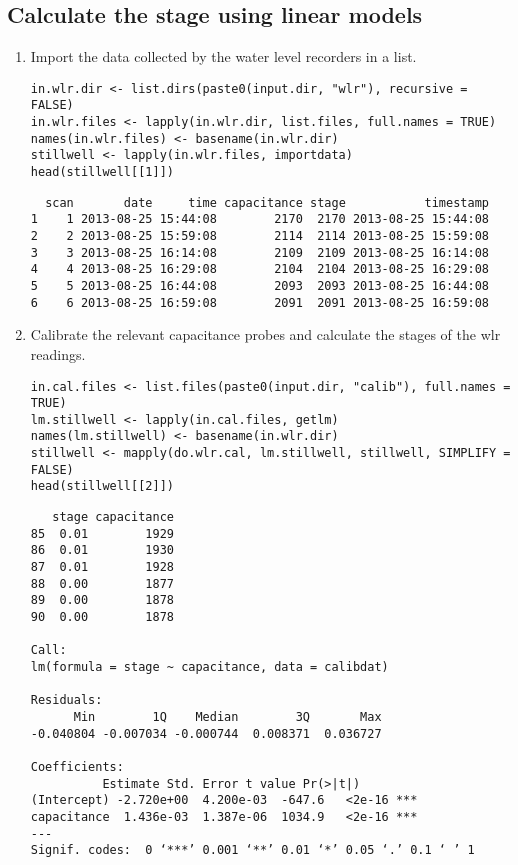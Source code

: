 \documentclass[a4paper]{article}
\begin{document}
\subsection*{Calculate the stage using linear models}
\label{sec:orga413899}

\begin{enumerate}
\item Import the data collected by the water level recorders in a list.

\begin{verbatim}
in.wlr.dir <- list.dirs(paste0(input.dir, "wlr"), recursive = FALSE)
in.wlr.files <- lapply(in.wlr.dir, list.files, full.names = TRUE)
names(in.wlr.files) <- basename(in.wlr.dir)
stillwell <- lapply(in.wlr.files, importdata)
head(stillwell[[1]])
\end{verbatim}

\begin{verbatim}
  scan       date     time capacitance stage           timestamp
1    1 2013-08-25 15:44:08        2170  2170 2013-08-25 15:44:08
2    2 2013-08-25 15:59:08        2114  2114 2013-08-25 15:59:08
3    3 2013-08-25 16:14:08        2109  2109 2013-08-25 16:14:08
4    4 2013-08-25 16:29:08        2104  2104 2013-08-25 16:29:08
5    5 2013-08-25 16:44:08        2093  2093 2013-08-25 16:44:08
6    6 2013-08-25 16:59:08        2091  2091 2013-08-25 16:59:08
\end{verbatim}

\item Calibrate the relevant capacitance probes and calculate the stages of the wlr readings.

\begin{verbatim}
in.cal.files <- list.files(paste0(input.dir, "calib"), full.names = TRUE)
lm.stillwell <- lapply(in.cal.files, getlm)
names(lm.stillwell) <- basename(in.wlr.dir)
stillwell <- mapply(do.wlr.cal, lm.stillwell, stillwell, SIMPLIFY = FALSE)
head(stillwell[[2]])
\end{verbatim}

\begin{verbatim}
   stage capacitance
85  0.01        1929
86  0.01        1930
87  0.01        1928
88  0.00        1877
89  0.00        1878
90  0.00        1878

Call:
lm(formula = stage ~ capacitance, data = calibdat)

Residuals:
      Min        1Q    Median        3Q       Max 
-0.040804 -0.007034 -0.000744  0.008371  0.036727 

Coefficients:
	      Estimate Std. Error t value Pr(>|t|)    
(Intercept) -2.720e+00  4.200e-03  -647.6   <2e-16 ***
capacitance  1.436e-03  1.387e-06  1034.9   <2e-16 ***
---
Signif. codes:  0 ‘***’ 0.001 ‘**’ 0.01 ‘*’ 0.05 ‘.’ 0.1 ‘ ’ 1


\end{verbatim}
\end{enumerate}
\end{document}
